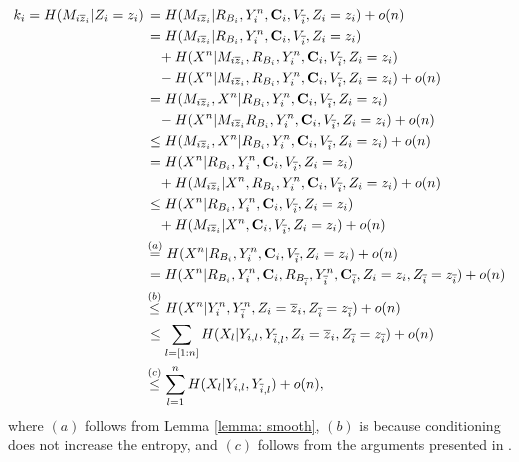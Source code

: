\documentclass[runningheads]{llncs}
\begin{document}
\begin{align}
           k_i = H(M_{i\overline{z}_i}|Z_i=z_i) & \,= H(M_{i\overline{z}_i}| R_{B_i}, Y_i^n, \mathbf{C}_i, V_{\overline{i}},Z_i = z_i) + o(n)\notag\\
           & \,= H(M_{i\overline{z}_i}| R_{B_i}, Y_i^n, \mathbf{C}_i, V_{\overline{i}},Z_i = z_i)\notag\\
           & \quad+ H(X^n|M_{i\overline{z}_i},R_{B_i}, Y_i^n, \mathbf{C}_i, V_{\overline{i}},Z_i = z_i)\notag\\
           & \quad - H(X^n|M_{i\overline{z}_i},R_{B_i}, Y_i^n, \mathbf{C}_i, V_{\overline{i}},Z_i = z_i) + o(n)\notag\\
           & \,= H(M_{i\overline{z}_i},X^n|R_{B_i}, Y_i^n, \mathbf{C}_i, V_{\overline{i}},Z_i = z_i)\notag\\
           & \quad- H(X^n|M_{i\overline{z}_i}R_{B_i}, Y_i^n, \mathbf{C}_i, V_{\overline{i}},Z_i = z_i) + o(n)\notag\\
           & \,\leq H(M_{i\overline{z}_i},X^n|R_{B_i}, Y_i^n, \mathbf{C}_i, V_{\overline{i}},Z_i = z_i) + o(n)\notag\\
           & \,= H(X^n|R_{B_i}, Y_i^n, \mathbf{C}_i, V_{\overline{i}},Z_i = z_i)\notag\\
           & \quad + H(M_{i\overline{z}_i}|X^n, R_{B_i}, Y_i^n, \mathbf{C}_i, V_{\overline{i}},Z_i = z_i) + o(n)\notag\\
           & \,\leq H(X^n|R_{B_i}, Y_i^n, \mathbf{C}_i, V_{\overline{i}},Z_i = z_i)\notag\\
           & \quad + H(M_{i\overline{z}_i}|X^n, \mathbf{C}_i, V_{\overline{i}},Z_i = z_i) + o(n)\notag\\ 
           & \stackrel{(a)}{=}  H(X^n|R_{B_i}, Y_i^n, \mathbf{C}_i, V_{\overline{i}},Z_i = z_i) + o(n)\notag\\
           & \,= H(X^n|R_{B_i}, Y_i^n, \mathbf{C}_i, R_{B_{\overline{i}}}, Y_{\overline{i}}^n, \mathbf{C}_{\overline{i}},Z_i = z_i, Z_{\overline{i}} = z_{\overline{i}}) + o(n)\notag\\
           & \stackrel{(b)}{\leq} H(X^n|Y_i^n,Y_{\overline{i}}^n,Z_i=\overline{z}_i, Z_{\overline{i}} = z_{\overline{i}}) + o(n)\notag\\
           & \,\leq \sum_{l=[1:n]} H(X_{l}|Y_{i,l}, Y_{\overline{i},l}, Z_i=\overline{z}_i, Z_{\overline{i}} = z_{\overline{i}}) + o(n)\notag\\
           & \stackrel{(c)}{\leq} \sum_{l=1}^{n} H(X_{l}|Y_{i,l}, Y_{\overline{i},l}) + o(n), 
       \end{align}
       where $(a)$ follows from Lemma \ref{lemma: smooth}, $(b)$ is because conditioning does not increase the entropy, and $(c)$ follows from the arguments presented in \cite{Rudolf1}.
\end{document}
